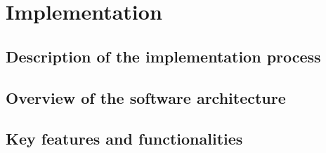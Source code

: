 %
\chapter{Implementation}
\label{sec:implementation}

\section{Description of the implementation process}
\label{sec:implementation:description}

\section{Overview of the software architecture}
\label{sec:implementation:overview}

\section{Key features and functionalities}
\label{sec:implementation:key}